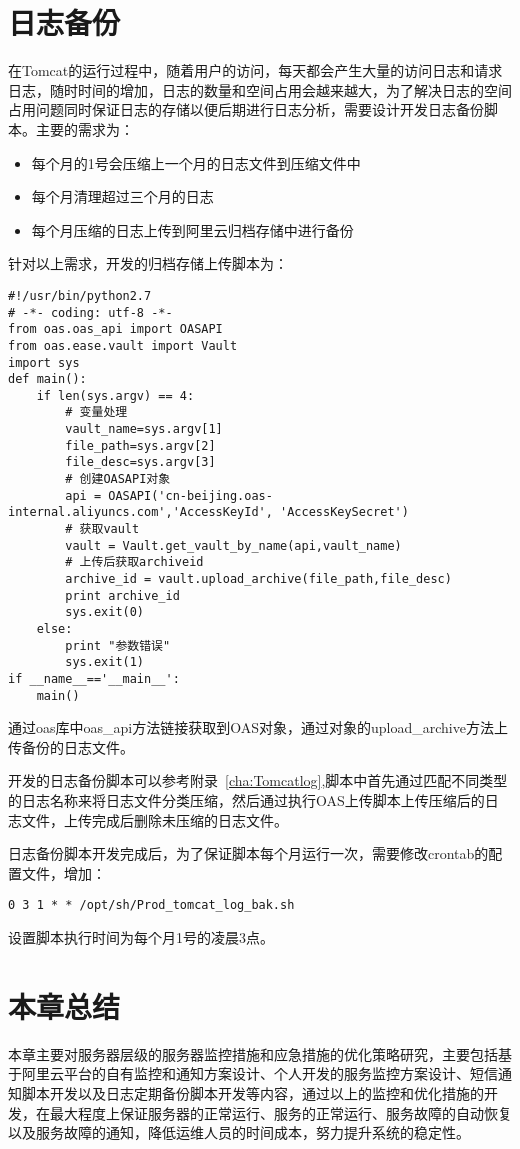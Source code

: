 \section{日志备份}
在Tomcat的运行过程中，随着用户的访问，每天都会产生大量的访问日志和请求日志，随时时间的增加，日志的数量和空间占用会越来越大，为了解决日志的空间占用问题同时保证日志的存储以便后期进行日志分析，需要设计开发日志备份脚本。主要的需求为：
\begin{itemize}
\item 每个月的1号会压缩上一个月的日志文件到压缩文件中
\item 每个月清理超过三个月的日志
\item 每个月压缩的日志上传到阿里云归档存储中进行备份
\end{itemize}
针对以上需求，开发的归档存储上传脚本为：
\begin{lstlisting}[numbers=none]
#!/usr/bin/python2.7
# -*- coding: utf-8 -*-
from oas.oas_api import OASAPI
from oas.ease.vault import Vault
import sys
def main():
    if len(sys.argv) == 4:
        # 变量处理
        vault_name=sys.argv[1]
        file_path=sys.argv[2]
        file_desc=sys.argv[3]
        # 创建OASAPI对象
        api = OASAPI('cn-beijing.oas-internal.aliyuncs.com','AccessKeyId', 'AccessKeySecret')
        # 获取vault
        vault = Vault.get_vault_by_name(api,vault_name)
        # 上传后获取archiveid
        archive_id = vault.upload_archive(file_path,file_desc)
        print archive_id
        sys.exit(0)
    else:
        print "参数错误"
        sys.exit(1)
if __name__=='__main__':
    main()
\end{lstlisting}
通过oas库中oas\_api方法链接获取到OAS对象，通过对象的upload\_archive方法上传备份的日志文件。

开发的日志备份脚本可以参考附录~\ref{cha:Tomcatlog},脚本中首先通过匹配不同类型的日志名称来将日志文件分类压缩，然后通过执行OAS上传脚本上传压缩后的日志文件，上传完成后删除未压缩的日志文件。

日志备份脚本开发完成后，为了保证脚本每个月运行一次，需要修改crontab的配置文件，增加：
\begin{lstlisting}[numbers=none]
0 3 1 * * /opt/sh/Prod_tomcat_log_bak.sh
\end{lstlisting}
设置脚本执行时间为每个月1号的凌晨3点。
\label{cha:Monitor-aliyun}
\section{本章总结}
本章主要对服务器层级的服务器监控措施和应急措施的优化策略研究，主要包括基于阿里云平台的自有监控和通知方案设计、个人开发的服务监控方案设计、短信通知脚本开发以及日志定期备份脚本开发等内容，通过以上的监控和优化措施的开发，在最大程度上保证服务器的正常运行、服务的正常运行、服务故障的自动恢复以及服务故障的通知，降低运维人员的时间成本，努力提升系统的稳定性。